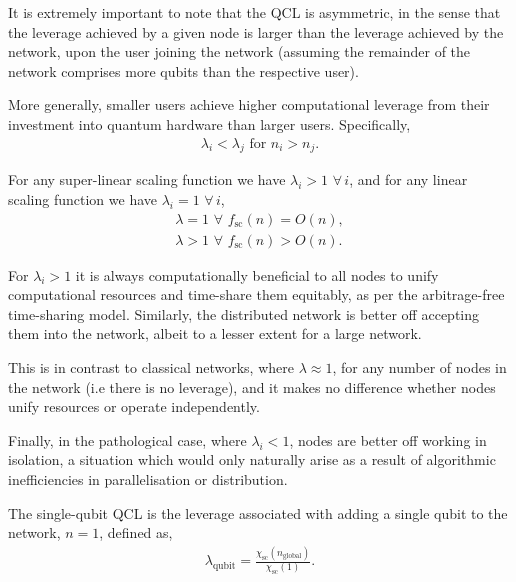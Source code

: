 It is extremely important to note that the QCL is asymmetric, in the sense that the leverage achieved by a given node is larger than the leverage achieved by the network, upon the user joining the network (assuming the remainder of the network comprises more qubits than the respective user).

More generally, smaller users achieve higher computational leverage from their investment into quantum hardware than larger users. Specifically,
\begin{align}
	\lambda_i<\lambda_j \,\,\text{for}\,\,n_i>n_j.
\end{align}

For any super-linear scaling function we have \mbox{$\lambda_i > 1 \,\,\forall \, i$}, and for any linear scaling function we have \mbox{$\lambda_i = 1 \,\,\forall \, i$},
\begin{align}
	\lambda=1\,\,\forall\,\,f_\text{sc}(n)=O(n), \nonumber \\
	\lambda>1\,\,\forall\,\,f_\text{sc}(n)>O(n).	
\end{align}

For \mbox{$\lambda_i>1$} it is always computationally beneficial to all nodes to unify computational resources and time-share them equitably, as per the arbitrage-free time-sharing model. Similarly, the distributed network is better off accepting them into the network, albeit to a lesser extent for a large network.

This is in contrast to classical networks, where \mbox{$\lambda\approx 1$}, for any number of nodes in the network (i.e there is no leverage), and it makes no difference whether nodes unify resources or operate independently.

Finally, in the pathological case, where \mbox{$\lambda_i<1$}, nodes are better off working in isolation, a situation which would only naturally arise as a result of algorithmic inefficiencies in parallelisation or distribution.

\begin{definition}
The single-qubit QCL is the leverage associated with adding a single qubit to the network, \mbox{$n=1$}, defined as,
\begin{align}
	\lambda_\text{qubit} = \frac{\chi_\text{sc}(n_\text{global})}{\chi_\text{sc}(1)}.
\end{align}
\end{definition}

